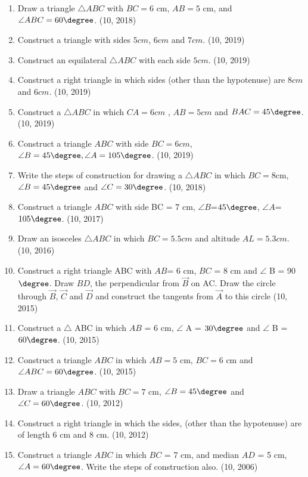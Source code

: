 \begin{enumerate}[label=\thesubsection.\arabic*,ref=\thesubsection.\theenumi]
    \item Draw a triangle $\triangle ABC$ with $BC = 6 \text{ cm}$, $AB = 5 \text{ cm}$, and $\angle ABC = 60\degree$.  \hfill (10, 2018)
\item Construct a triangle with sides $5cm$, $6cm$ and $7cm$. 
		\hfill (10, 2019)
\item Construct an equilateral $\triangle ABC$ with each side $5 cm$. 
		\hfill (10, 2019)
\item Construct a right triangle in which sides (other than the hypotenuse) are $8 cm$ and $6 cm$. 
		\hfill (10, 2019)

\item Construct a $\triangle ABC$ in which $CA = 6cm$ , $AB = 5cm$ and $BAC= 45\degree$. 
		\hfill (10, 2019)
\item Construct a triangle $ABC$ with side $BC = 6 cm$, $\angle B=45\degree, \angle A= 105\degree$. 
		\hfill (10, 2019)
\item Write the steps of construction for drawing a $\triangle ABC$ in which $BC=8$cm, $\angle B=45\degree$ and $\angle C= 30\degree$. 
		\hfill (10, 2018)
\item Construct a triangle $ABC$ with side BC = $7$ cm, $\angle{B}$=$45\degree$, $\angle{A}$=$105\degree$. 
		\hfill (10, 2017)
\item Draw an isosceles $\triangle ABC$ in which $BC=5.5 cm$ and altitude $AL=5.3 cm$. 
		\hfill (10, 2016)
     \item Construct a right triangle ABC with $AB$= $6$ cm, $BC$ = $8$ cm and $\angle$ B = 90$\degree$. Draw $BD$, the perpendicular from $\vec{B}$ on AC. Draw the circle through $\vec{B}$, $\vec{C}$ and $\vec{D}$ and construct the tangents from $\vec{A}$ to this circle
		\hfill (10, 2015)

     \item Construct a $\triangle$ ABC in which  $AB$ = $6$ cm, $\angle$ A = $30\degree $ and $\angle$ B = $60\degree$. 
		\hfill (10, 2015)
\item Construct a triangle $ABC$ in which $AB = 5$ cm, $BC = 6$ cm and $\angle ABC = 60\degree$. 
		\hfill (10, 2015)
\item Draw a triangle $ABC$ with $BC = 7 \text{ cm}$, $\angle B = 45 \degree$ and $\angle C = 60 \degree$. 
		\hfill (10, 2012)
\item Construct a right triangle in which the sides, (other than the hypotenuse) are of length $6\text{ cm}$ and $8\text{ cm}$. 
		\hfill (10, 2012)
\item Construct a triangle $ABC$ in which $BC$ = 7 cm, and median $AD$ = 5 cm, $\angle A=60\degree$. Write      the steps of construction also.
\hfill	(10, 2006)
\end{enumerate}

